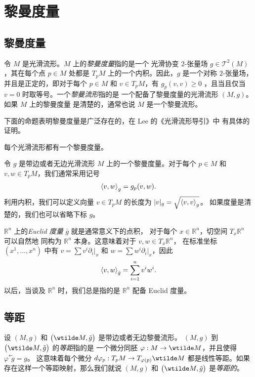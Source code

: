 \chapter{黎曼度量}

\section{黎曼度量}

令 $M$ 是光滑流形。$M$ 上的\emph{黎曼度量}指的是一个
光滑协变 $2$-张量场 $g\in \mathcal{T}^2(M)$，其在每个点 $p\in M$
处都是 $T_pM$ 上的一个内积。因此，$g$ 是一个对称 $2$-张量场，
并且是正定的，即对于每个 $p\in M$ 和 $v\in T_pM$，有 $g_p(v,v)\geq 0$
，且当且仅当 $v=0$ 时取等号。一个\emph{黎曼流形}指的是
一个配备了黎曼度量的光滑流形 $(M,g)$。如果 $M$ 上的黎曼度量
是清楚的，通常也说 $M$ 是一个黎曼流形。

下面的命题表明黎曼度量是广泛存在的，在 Lee 的《光滑流形导引》中
有具体的证明。

\begin{proposition}
  每个光滑流形都有一个黎曼度量。
\end{proposition}


令 $g$ 是带边或者无边光滑流形 $M$ 上的一个黎曼度量。对于每个 $p\in M$
和 $v,w\in T_pM$，我们通常采用记号
\[
  \left\langle v,w\right\rangle_g=g_p(v,w).
\]
利用内积，我们可以定义向量 $v\in T_pM$ 的长度为 $|v|_g=\sqrt{\left\langle v,v\right\rangle_g}$。
如果度量是清楚的，我们也可以省略下标 $g$。

\begin{example}[Euclid 度量]
  $\mathbb{R}^n$ 上的\emph{Euclid 度量} $\bar g$ 就是通常意义下的点积，
  对于每个 $x\in \mathbb{R}^n$，切空间 $T_x \mathbb{R}^n$ 可以自然地
  同构为 $\mathbb{R}^n$ 本身。这意味着对于 $v,w\in T_x \mathbb{R}^n$，
  在标准坐标 $(x^1,\dots,x^n)$ 中有 $v=\sum v^i\partial_i|_x$ 和
  $w=\sum w^i\partial_i|_x$，因此
  \[
    \left\langle v,w\right\rangle_{\bar g}= \sum_{i=1}^n v^i w^i.
  \]
  以后，当谈及 $\mathbb{R}^n$ 时，我们总是指的是 $\mathbb{R}^n$ 配备 Euclid 度量。
\end{example}

\section{等距}

设 $(M,g)$ 和 $\bigl(\wtilde M,\tilde g\bigr)$ 是带边或者无边黎曼流形。
$(M,g)$ 到 $\bigl(\wtilde M,\tilde g\bigr)$ 的\emph{等距}指的是
一个微分同胚 $\varphi:M\to\wtilde M$，并且使得 $\varphi^*\tilde g=g$。
这意味着每个微分 $d\varphi_p:T_pM\to T_{\varphi(p)}\wtilde M$
都是线性等距。如果存在这样一个等距映射，那么我们就说 $(M,g)$ 和
$\bigl(\wtilde M,\tilde g\bigr)$ 是\emph{等距的}。

